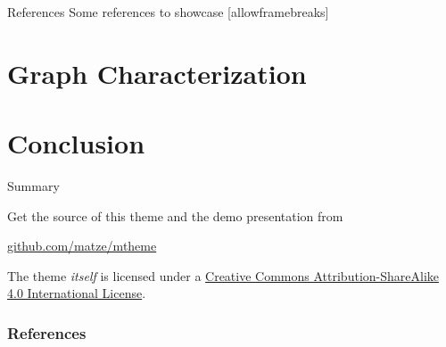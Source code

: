 \documentclass[10pt]{beamer}
\begin{document}


\begin{frame}{References}
  Some references to showcase [allowframebreaks] \cite{knuth92,ConcreteMath,Simpson,Er01,greenwade93}
\end{frame}


\section{Graph Characterization}

\section{Conclusion}

\begin{frame}{Summary}

  Get the source of this theme and the demo presentation from

  \begin{center}\url{github.com/matze/mtheme}\end{center}

  The theme \emph{itself} is licensed under a
  \href{http://creativecommons.org/licenses/by-sa/4.0/}{Creative Commons
  Attribution-ShareAlike 4.0 International License}.

  \begin{center}\ccbysa\end{center}

\end{frame}


\begin{frame}[allowframebreaks]

  \frametitle{References}

  
  

\end{frame}
\end{document}
